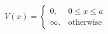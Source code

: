\documentclass[preview]{standalone}
\begin{document}
\begin{align*}
V(x) = \begin{cases} 0, & 0 \leq x \leq a \\ \infty, & \text{otherwise} \end{cases}
\end{align*}
\end{document}
